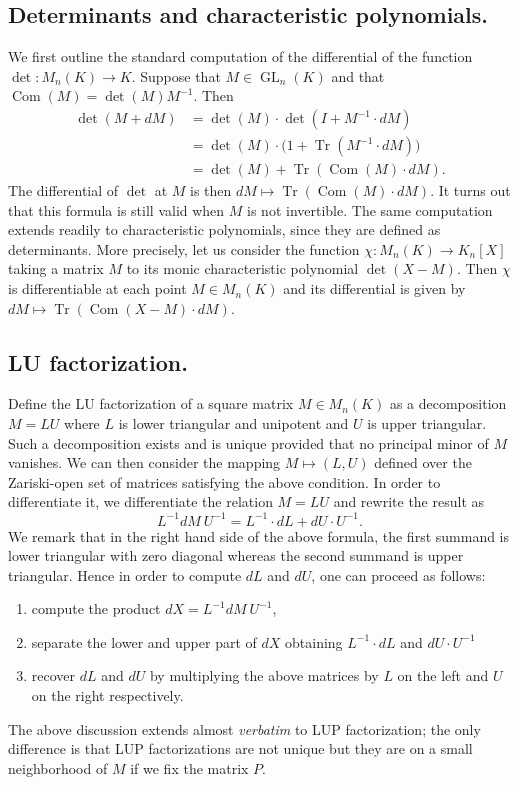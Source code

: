 \documentclass{sig-alternate}
\DeclareMathOperator{\GL}{GL}
\DeclareMathOperator{\tr}{Tr}
\DeclareMathOperator{\com}{Com}
\begin{document}
{\subsection*{Determinants and characteristic polynomials.}

We first outline the standard computation of the differential of the function
$\det : M_n(K) \to K$. Suppose that $M \in \GL_n(K)$ and that $\com(M) = \det(M) M^{-1}$.
Then
\begin{align*}
\det(M + dM) &= \det(M) \cdot \det(I + M^{-1} \cdot dM)  \\
&= \det(M) \cdot \big(1 + \tr(M^{-1} \cdot dM)\big) \\
&= \det(M) + \tr(\com(M) \cdot dM).
\end{align*}
The differential of $\det$ at $M$ is then $dM \mapsto \tr(\com(M) \cdot dM)$. It turns
out that this formula is still valid when $M$ is not invertible.
The same computation extends readily to characteristic polynomials,
since they are defined as determinants. More precisely, let us 
consider the function $\chi : M_n(K) \to K_n[X]$ taking a matrix 
$M$ to its monic characteristic polynomial $\det(X-M)$.
Then $\chi$ is differentiable at each point $M \in M_n(K)$ and its 
differential is given by $dM \mapsto \tr(\com(X{-}M) \cdot dM)$.

\subsection*{LU factorization.}

Define the LU factorization of a square matrix $M \in M_n(K)$ as a decomposition $M = LU$ 
where $L$ is lower triangular and unipotent and $U$ is upper triangular. 
Such a decomposition exists and is unique provided that no principal minor
of $M$ vanishes. We can then consider the mapping $M \mapsto (L,U)$ 
defined over the Zariski-open set of matrices satisfying the above 
condition. In order to differentiate it, we differentiate the relation 
$M = LU$ and rewrite the result as
$$L^{-1} dM \: U^{-1} = L^{-1} \cdot dL + dU \cdot U^{-1}.$$
We remark that in the right hand side of the above formula, the first
summand is lower triangular with zero diagonal whereas 
the second summand is upper triangular. Hence in order to compute $dL$
and $dU$, one can proceed as follows: 
\begin{enumerate}
\item compute the product $dX = L^{-1} dM \: U^{-1}$,
\item separate the lower and upper part of $dX$ obtaining $L^{-1} \cdot dL$ and $dU \cdot U^{-1}$
\item recover $dL$ and $dU$ by multiplying the above matrices by $L$ on the left and $U$ on the right respectively.
\end{enumerate}
The above discussion extends almost \emph{verbatim} to LUP 
factorization; the only difference is that LUP factorizations are not 
unique but they are on a small neighborhood of $M$ if we fix the matrix 
$P$.

}
\end{document}
